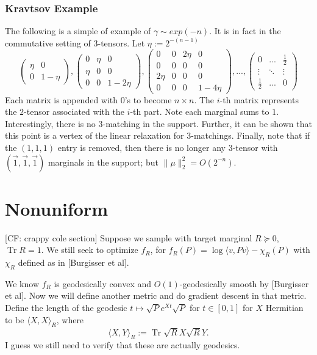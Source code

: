 \documentclass{article}
\newcommand\tr{\operatorname{Tr}}
\newcommand{\CF}[1]{{\color{purple}[CF: #1]}}
\begin{document}
\subsubsection{Kravtsov Example}
The following is a simple of example of $\gamma \sim exp(-n)$. It is in fact in the commutative setting of $3$-tensors. Let $\eta := 2^{-(n-1)}$
\[ \begin{pmatrix}
     \eta  & 0
\\   0     & 1-\eta
   \end{pmatrix},
   \begin{pmatrix}
     0     & \eta & 0
\\   \eta  & 0    & 0
\\   0     & 0    & 1-2\eta
   \end{pmatrix},
   \begin{pmatrix}
     0     & 0    & 2\eta & 0
\\   0     & 0    & 0     & 0
\\   2\eta & 0    & 0     & 0
\\   0     & 0    & 0     & 1-4\eta
   \end{pmatrix},
   ...,
   \begin{pmatrix}
     0 & ... & \frac{1}{2}
\\   \vdots & \ddots & \vdots
\\   \frac{1}{2} & ... & 0
   \end{pmatrix}
\]
Each matrix is appended with 0's to become $n \times n$. The $i$-th matrix represents the $2$-tensor associated with the $i$-th part. Note each marginal sums to $1$. Interestingly, there is no $3$-matching in the support. Further, it can be shown that this point is a vertex of the linear relaxation for $3$-matchings. Finally, note that if the $(1,1,1)$ entry is removed, then there is no longer any $3$-tensor with $(\vec{1},\vec{1},\vec{1})$ marginals in the support; but $ \|\mu\|_{2}^{2} = O(2^{-n})$. 



\section{Nonuniform}
\CF{crappy cole section}
Suppose we sample with target marginal $R \succeq 0$, $\tr R = 1$. We still seek to optimize $f_R$, for $f_R(P) = \log \langle v, P v \rangle - \chi_R(P)$ with $\chi_R$ defined as in [Burgisser et al]. 

We know $f_R$ is geodesically convex and $O(1)$-geodesically smooth by [Burgisser et al]. Now we will define another metric and do gradient descent in that metric. Define the length of the geodesic $t\mapsto \sqrt{P}e^{Xt}\sqrt{P}$ for $t \in [0,1]$ for $X$ Hermitian to be $\langle X, X \rangle_R$, where 
$$\langle X, Y \rangle_R := \tr \sqrt{R} X  \sqrt{R} Y. $$
I guess we still need to verify that these are actually geodesics. 
\end{document}
